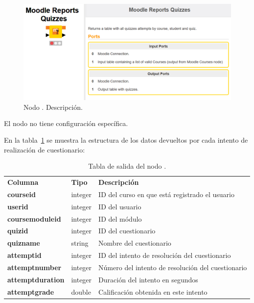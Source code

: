 \begin{figure}[!h]
	\centering
	\includegraphics[width=1\textwidth]{img/nodes_moodle_reports_quizzes.png}
	\caption{Nodo . Descripción.}
	\label{fig:moodlereportsquizzes}
\end{figure}
\FloatBarrier


El nodo no tiene configuración específica. 
\

En la tabla~\ref{tab:moodle_reports_quizzes_desc} se muestra la estructura de los datos devueltos por cada intento de realización de cuestionario: 

\begin{table}[!h]
	\begin{center}
		\begin{tabular}{p{}p{}p{}}
			\toprule
			\textbf{Columna} & \textbf{Tipo} & \textbf{Descripción}\\
			\otoprule
			\textbf{courseid} & integer & ID del curso en que está registrado el usuario \\
         \hline
			\textbf{userid} & integer & ID del usuario \\
         \hline
         \textbf{coursemoduleid} & integer & ID del módulo \\
         \hline
		 \textbf{quizid} & integer & ID del cuestionario \\
         \hline
         \textbf{quizname} & string & Nombre del cuestionario \\
         \hline
		 \textbf{attemptid} & integer & ID del intento de resolución del cuestionario \\
         \hline
		 \textbf{attemptnumber} & integer & Número del intento de resolución del cuestionario \\
         \hline
		 \textbf{attemptduration} & integer & Duración del intento en segundos \\
         \hline
         \textbf{attemptgrade} & double & Calificación obtenida en este intento \\
         \bottomrule
		\end{tabular}
	\end{center}
	\caption{Tabla de salida del nodo .}
	\label{tab:moodle_reports_quizzes_desc}
\end{table}
\FloatBarrier


